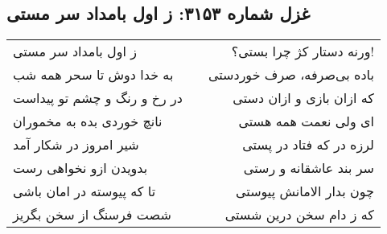 \begin{center}
\section*{غزل شماره ۳۱۵۳: ز اول بامداد سر مستی}
\label{sec:3153}
\begin{longtable}{l p{0.5cm} r}
ز اول بامداد سر مستی
&&
ورنه دستار کژ چرا بستی؟!
\\
به خدا دوش تا سحر همه شب
&&
باده بی‌صرفه، صرف خوردستی
\\
در رخ و رنگ و چشم تو پیداست
&&
که ازان بازی و ازان دستی
\\
نانچ خوردی بده به مخموران
&&
ای ولی نعمت همه هستی
\\
شیر امروز در شکار آمد
&&
لرزه در که فتاد در پستی
\\
بدویدن ازو نخواهی رست
&&
سر بند عاشقانه و رستی
\\
تا که پیوسته در امان باشی
&&
چون بدار الامانش پیوستی
\\
شصت فرسنگ از سخن بگریز
&&
که ز دام سخن درین شستی
\\
\end{longtable}
\end{center}
